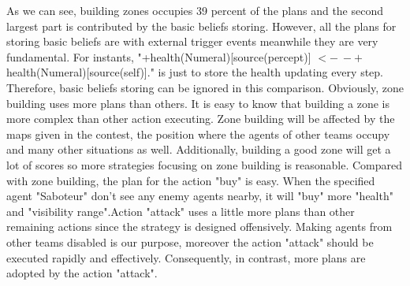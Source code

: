 As we can see, building zones occupies 39 percent of the plans and the second largest part is contributed by the basic beliefs storing. However, all the plans for storing basic beliefs are with external trigger events meanwhile they are very fundamental. For instants, "+health(Numeral)[source(percept)] $<- \ -+$health(Numeral)[source(self)]." is just to store the health updating every step. Therefore, basic beliefs storing can be ignored in this comparison. Obviously, zone building uses more plans than others. It is easy to know that building a zone is more complex than other action executing. Zone building will be affected by the maps given in the contest, the position where the agents of other teams occupy and many other situations as well. Additionally, building a good zone will get a lot of scores so more strategies focusing on zone building is reasonable. Compared with zone building, the plan for the action "buy" is easy. When the specified agent "Saboteur" don't see any enemy agents nearby, it will "buy" more "health" and "visibility range".Action "attack" uses a little more plans than other remaining actions since the strategy is designed offensively. Making agents from other teams disabled is our purpose, moreover the action "attack" should be executed rapidly and effectively. Consequently, in contrast, more plans are adopted by the action "attack".

